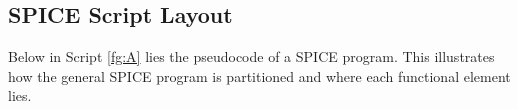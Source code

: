\documentclass{article}
\begin{document}
\subsection{SPICE Script Layout}
Below in Script \ref{fg:A} lies the pseudocode of a SPICE program. This illustrates how the general SPICE program is partitioned and where each functional element lies.
\begin{center}
\end{center}
\cleardoublepage
\setcounter{page}{1}
\nocite{PennEngineering}	


\end{document}
